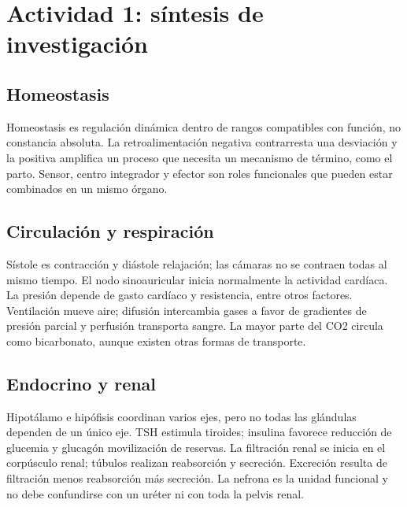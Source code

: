 \def\uadectitulo{Fisiología humana}


\portadaUAdeC
\section{Actividad 1: síntesis de investigación}
\subsection{Homeostasis}
Homeostasis es regulación dinámica dentro de rangos compatibles con función, no constancia absoluta. La retroalimentación negativa contrarresta una desviación y la positiva amplifica un proceso que necesita un mecanismo de término, como el parto. Sensor, centro integrador y efector son roles funcionales que pueden estar combinados en un mismo órgano.
\subsection{Circulación y respiración}
Sístole es contracción y diástole relajación; las cámaras no se contraen todas al mismo tiempo. El nodo sinoauricular inicia normalmente la actividad cardíaca. La presión depende de gasto cardíaco y resistencia, entre otros factores. Ventilación mueve aire; difusión intercambia gases a favor de gradientes de presión parcial y perfusión transporta sangre. La mayor parte del CO2 circula como bicarbonato, aunque existen otras formas de transporte.
\subsection{Endocrino y renal}
Hipotálamo e hipófisis coordinan varios ejes, pero no todas las glándulas dependen de un único eje. TSH estimula tiroides; insulina favorece reducción de glucemia y glucagón movilización de reservas. La filtración renal se inicia en el corpúsculo renal; túbulos realizan reabsorción y secreción. Excreción resulta de filtración menos reabsorción más secreción. La nefrona es la unidad funcional y no debe confundirse con un uréter ni con toda la pelvis renal.
